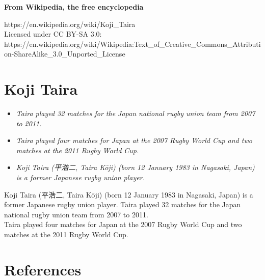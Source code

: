 \textbf{From Wikipedia, the free encyclopedia}

https://en.wikipedia.org/wiki/Koji\_Taira\\
Licensed under CC BY-SA 3.0:\\
https://en.wikipedia.org/wiki/Wikipedia:Text\_of\_Creative\_Commons\_Attribution-ShareAlike\_3.0\_Unported\_License

\section{Koji Taira}\label{koji-taira}

\begin{itemize}
\item
  \emph{Taira played 32 matches for the Japan national rugby union team
  from 2007 to 2011.}
\item
  \emph{Taira played four matches for Japan at the 2007 Rugby World Cup
  and two matches at the 2011 Rugby World Cup.}
\item
  \emph{Koji Taira (平浩二, Taira Kōji) (born 12 January 1983 in
  Nagasaki, Japan) is a former Japanese rugby union player.}
\end{itemize}

Koji Taira (平浩二, Taira Kōji) (born 12 January 1983 in Nagasaki,
Japan) is a former Japanese rugby union player. Taira played 32 matches
for the Japan national rugby union team from 2007 to 2011.\\
Taira played four matches for Japan at the 2007 Rugby World Cup and two
matches at the 2011 Rugby World Cup.

\section{References}\label{references}
